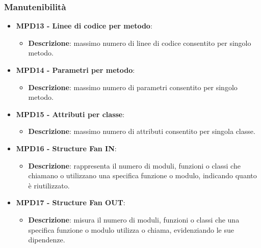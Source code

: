 \documentclass[10pt]{article}
\begin{document}
\begin{justify}
\subsubsection{Manutenibilità}
\begin{itemize}
    \item \textbf{MPD13 - Linee di codice per metodo}:
      \begin{itemize}
        \item \textbf{Descrizione}: massimo numero di linee di codice consentito per singolo metodo.
      \end{itemize}
    \item \textbf{MPD14 - Parametri per metodo}:
      \begin{itemize}
        \item \textbf{Descrizione}: massimo numero di parametri consentito per singolo metodo.
      \end{itemize}
    \item \textbf{MPD15 - Attributi per classe}:
      \begin{itemize}
        \item \textbf{Descrizione}: massimo numero di attributi consentito per singola classe.
      \end{itemize}
    \item \textbf{MPD16 - Structure Fan IN}:
      \begin{itemize}
        \item \textbf{Descrizione}: rappresenta il numero di moduli, funzioni o classi che chiamano o utilizzano una specifica funzione o modulo, indicando quanto è riutilizzato.
      \end{itemize}
    \item \textbf{MPD17 - Structure Fan OUT}:
      \begin{itemize}
        \item \textbf{Descrizione}: misura il numero di moduli, funzioni o classi che una specifica funzione o modulo utilizza o chiama, evidenziando le sue dipendenze.
      \end{itemize}
\end{itemize}


\end{justify}
\end{document}
